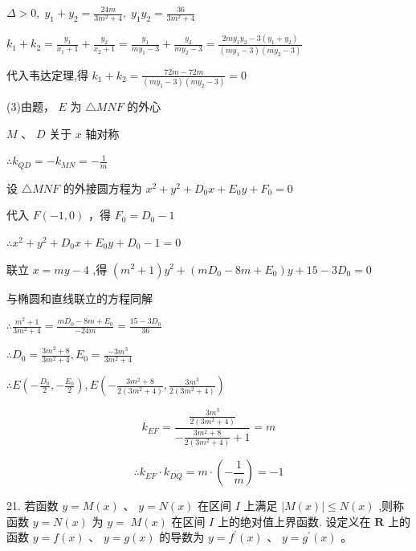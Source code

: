 \documentclass[10pt]{article}
\begin{document}
\(\Delta  > 0,\;{y}_{1} + {y}_{2} = \frac{24m}{3{m}^{2} + 4},\;{y}_{1}{y}_{2} = \frac{36}{3{m}^{2} + 4}\)

\({k}_{1} + {k}_{2} = \frac{{y}_{1}}{{x}_{1} + 1} + \frac{{y}_{2}}{{x}_{2} + 1} = \frac{{y}_{1}}{m{y}_{1} - 3} + \frac{{y}_{2}}{m{y}_{2} - 3} = \frac{{2m}{y}_{1}{y}_{2} - 3\left( {{y}_{1} + {y}_{2}}\right) }{\left( {m{y}_{1} - 3}\right) \left( {m{y}_{2} - 3}\right) }\)

代入韦达定理,得 \({k}_{1} + {k}_{2} = \frac{{72m} - {72m}}{\left( {m{y}_{1} - 3}\right) \left( {m{y}_{2} - 3}\right) } = 0\)

(3)由题， \(E\) 为 \(\bigtriangleup  {MNF}\) 的外心

\(M\text{ 、 }D\) 关于 \(x\) 轴对称

\(\therefore {k}_{QD} =  - {k}_{MN} =  - \frac{1}{m}\)

设 \(\bigtriangleup {MNF}\) 的外接圆方程为 \({x}^{2} + {y}^{2} + {D}_{0}x + {E}_{0}y + {F}_{0} = 0\)

代入 \(F\left( {-1,0}\right)\) ，得 \({F}_{0} = {D}_{0} - 1\)

\(\therefore {x}^{2} + {y}^{2} + {D}_{0}x + {E}_{0}y + {D}_{0} - 1 = 0\)

联立 \(x = {my} - 4\) ,得 \(\left( {{m}^{2} + 1}\right) {y}^{2} + \left( {m{D}_{0} - {8m} + {E}_{0}}\right) y + {15} - 3{D}_{0} = 0\)

与椭圆和直线联立的方程同解

\(\therefore \frac{{m}^{2} + 1}{3{m}^{2} + 4} = \frac{m{D}_{0} - {8m} + {E}_{0}}{-{24m}} = \frac{{15} - 3{D}_{0}}{36}\)

\(\therefore {D}_{0} = \frac{3{m}^{2} + 8}{3{m}^{2} + 4},{E}_{0} = \frac{-3{m}^{3}}{3{m}^{2} + 4}\)

\(\therefore E\left( {-\frac{{D}_{0}}{2}, - \frac{{E}_{0}}{2}}\right) ,E\left( {-\frac{3{m}^{2} + 8}{2\left( {3{m}^{2} + 4}\right) },\frac{3{m}^{3}}{2\left( {3{m}^{2} + 4}\right) }}\right)\)

\[
{k}_{EF} = \frac{\frac{3{m}^{3}}{2\left( {3{m}^{2} + 4}\right) }}{-\frac{3{m}^{2} + 8}{2\left( {3{m}^{2} + 4}\right) } + 1} = m
\]

\[
\therefore {k}_{EF} \cdot  {k}_{DQ} = m \cdot  \left( {-\frac{1}{m}}\right)  =  - 1
\]

21. 若函数 \(y = M\left( x\right) \text{ 、 }y = N\left( x\right)\) 在区间 \(I\) 上满足 \(\left| {M\left( x\right) }\right|  \leq  N\left( x\right)\) ,则称函数 \(y = N\left( x\right)\) 为 \(y = \; M\left( x\right)\) 在区间 \(I\) 上的绝对值上界函数. 设定义在 \(\mathbf{R}\) 上的函数 \(y = f\left( x\right) \text{ 、 }y = g\left( x\right)\) 的导数为 \(y = {f}^{\prime }\left( x\right) \text{ 、 }y = {g}^{\prime }\left( x\right)\) 。
\end{document}
